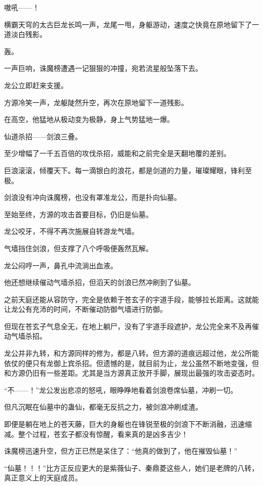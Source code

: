 
\begin{this_body}

嗷吼——！

横霸天穹的太古巨龙长鸣一声，龙尾一甩，身躯游动，速度之快竟在原地留下了一道淡白残影。

轰。

一声巨响，诛魔榜遭遇一记狠狠的冲撞，宛若流星般坠落下去。

龙公立即赶来支援。

方源冷笑一声，龙躯陡然升空，再次在原地留下一道残影。

在高空，他猛地从极动变为极静，身上气势猛地一爆。

仙道杀招——剑浪三叠。

至少增幅了一千五百倍的攻伐杀招，威能和之前完全是天翻地覆的差别。

巨浪滚滚，倾覆天下。每一滴银白的浪花，都是剑道的力量，璀璨耀眼，锋利至极。

剑浪没有冲向诛魔榜，也没有罩准龙公，而是扑向仙墓。

至始至终，方源的攻击首要目标，仍旧是仙墓。

龙公咬牙，不得不再次施展自转游龙气墙。

气墙挡住剑浪，但支撑了八个呼吸便轰然瓦解。

龙公闷哼一声，鼻孔中流淌出血液。

他还想继续催动气墙杀招，但滔天的剑浪已然冲刷到了仙墓。

之前天庭还能从容防守，完全是依赖于苍玄子的宇道手段，能够拉长距离。这就能让龙公有充沛的时间，不断催动防御气墙进行防御。

但现在苍玄子气息全无，在地上躺尸，没有了宇道手段遮护，龙公完全来不及再催动气墙杀招。

龙公并非九转，和方源同样的修为，都是八转。但方源的道痕远超过他，龙公所能依仗的便只有龙御上宾杀招。但遗憾的是，就目前为止，龙公虽然不断地变强，但和方源仍旧有一些差距。尤其是当方源真正放开手脚，展现出最强的攻击姿态时。

“不——！”龙公发出悲凉的怒吼，眼睁睁地看着剑浪卷席仙墓，冲刷一切。

但凡沉眠在仙墓中的蛊仙，都毫无反抗之力，被剑浪冲刷成渣。

即便是躺在地上的苍天藤，巨大的身躯也在锋锐至极的剑浪下不断消融，迅速缩减。整个过程，苍玄子都没有惊醒，看来真的是凶多吉少！

诛魔榜迅速升空，但方正已然是呆住了：“他真的做到了，他在摧毁仙墓！”

“仙墓！！！”比方正反应更大的是紫薇仙子、秦鼎菱这些人，她们是老牌的八转，真正意义上的天庭成员。


\end{this_body}
